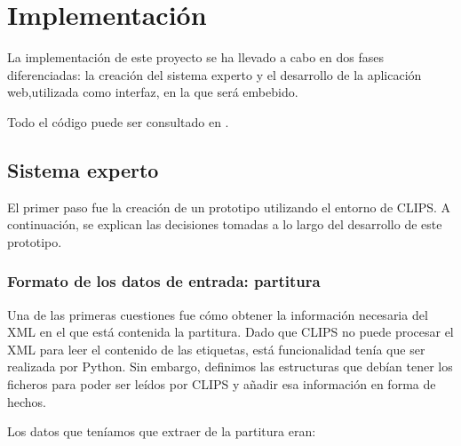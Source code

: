 \chapter{Implementación}

La implementación de este proyecto se ha llevado a cabo en dos fases diferenciadas: la creación del sistema experto y el desarrollo de la aplicación web,utilizada como interfaz, en la que será embebido. 

Todo el código puede ser consultado en \cite{CODIGO}.

\section{Sistema experto}

El primer paso fue la creación de un prototipo utilizando el entorno de CLIPS. A continuación, se explican las decisiones tomadas a lo largo del desarrollo de este prototipo.

\subsection{Formato de los datos de entrada: partitura}

Una de las primeras cuestiones fue cómo obtener la información necesaria del XML en el que está contenida la partitura. Dado que CLIPS no puede procesar el XML para leer el contenido de las etiquetas, está funcionalidad tenía que ser realizada por Python. Sin embargo, definimos las estructuras que debían tener los ficheros para poder ser leídos por CLIPS y añadir esa información en forma de hechos.

Los datos que teníamos que extraer de la partitura eran:

